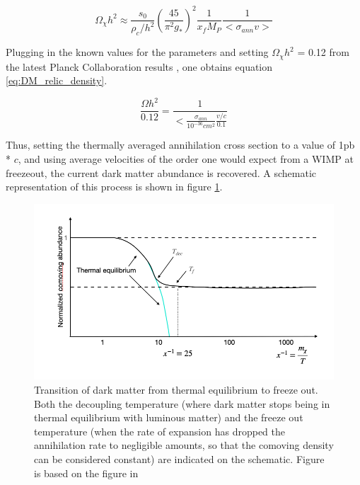\begin{equation}
    \label{eq:sol_Boltzmann}
    \Omega_\chi h^2 \approx \frac{s_0}{\rho_c/h^2} \left( \frac{45}{\pi^2g_*}\right)^2 \frac{1}{x_f M_P} \frac{1}{<\sigma_{ann}v>}
\end{equation}

Plugging in the known values for the parameters\cite{ref 533 DM review} and setting $\Omega_\chi h^2$ = 0.12 from the latest Planck Collaboration results \cite{Planck2018}, one obtains equation \ref{eq:DM_relic_density}. 

\begin{equation}
    \label{eq:DM_relic_density}
    \frac{\Omega h^2}{0.12} = \frac{1}{<\frac{\sigma_{ann}}{10^{-36} cm^2} \frac{v/c}{0.1}}
\end{equation}

Thus, setting the thermally averaged annihilation cross section to a value of 1pb * $c$, and using average velocities of the order one would expect from a WIMP at freezeout, the current dark matter abundance is recovered. A schematic representation of this process is shown in figure \ref{fig:DM_thremal_eq_freeze_out}. 

\begin{figure}[htbp]
    \centering
    \includegraphics[width=\textwidth]{figures/schematic_thermal_eq_evolution_DM.png}
    \caption{Transition of dark matter from thermal equilibrium to freeze out. Both the decoupling temperature (where dark matter stops being in thermal equilibrium with luminous matter) and the freeze out temperature (when the rate of expansion has dropped the annihilation rate to negligible amounts, so that the comoving density can be considered constant) are indicated on the schematic. Figure is based on the figure in \cite{Baer}}
    \label{fig:DM_thremal_eq_freeze_out}
\end{figure}
